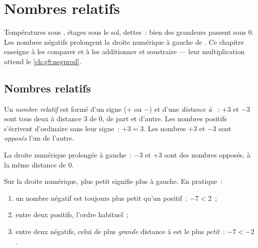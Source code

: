 \chapter{Nombres relatifs}\label{ch:g7:negatives}

Températures sous , étages sous le sol, dettes~: bien des
grandeurs passent sous $0$. Les nombres négatifs prolongent la droite
numérique à gauche de . Ce chapitre enseigne à les comparer et à
les additionner et soustraire --- leur multiplication attend le
\cref{ch:g8:negprod}.

\section{Nombres relatifs}

\begin{definition}\label{def:g7:negatives:def}
Un \emph{nombre relatif} est formé d'un signe
($+$ ou $-$) et d'une \emph{distance à }~: $+3$ et $-3$ sont tous
deux à distance $3$ de $0$, de part et d'autre. Les nombres positifs
s'écrivent d'ordinaire sans leur signe~: $+3 = 3$. Les nombres $+3$
et $-3$ sont \emph{opposés} l'un de l'autre.
\end{definition}

\begin{omfigure}

{\small La droite numérique prolongée à gauche~: $-3$ et $+3$ sont
des nombres opposés, à la même distance de $0$.}
\end{omfigure}

\begin{method}\label{met:g7:negatives:compare}
Sur la droite numérique, plus petit signifie plus à gauche. En
pratique~:
\begin{enumerate}
  \item un nombre négatif est toujours plus petit qu'un positif~:
        $-7 < 2$~;
  \item entre deux positifs, l'ordre habituel~;
  \item entre deux négatifs, celui de plus \emph{grande} distance à
         est le plus \emph{petit}~: $-7 < -2$.
\end{enumerate}
\end{method}

